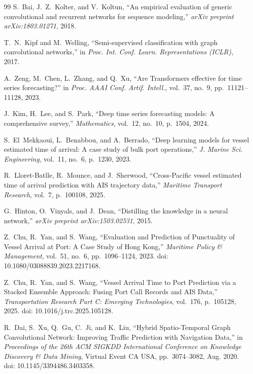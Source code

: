 \documentclass[sigconf,anonymous]{acmart}%
\begin{document}
\begin{thebibliography}{99}
S.~Bai, J.~Z.~Kolter, and V.~Koltun, ``An empirical evaluation of generic convolutional and recurrent networks for sequence modeling,'' \textit{arXiv preprint arXiv:1803.01271}, 2018.

T.~N.~Kipf and M.~Welling, ``Semi-supervised classification with graph convolutional networks,'' in \textit{Proc. Int. Conf. Learn. Representations (ICLR)}, 2017.

A.~Zeng, M.~Chen, L.~Zhang, and Q.~Xu, ``Are Transformers effective for time series forecasting?'' in \textit{Proc. AAAI Conf. Artif. Intell.}, vol.~37, no.~9, pp.~11121--11128, 2023.

J.~Kim, H.~Lee, and S.~Park, ``Deep time series forecasting models: A comprehensive survey,'' \textit{Mathematics}, vol.~12, no.~10, p.~1504, 2024.

S.~El~Mekkaoui, L.~Benabbou, and A.~Berrado, ``Deep learning models for vessel estimated time of arrival: A case study of bulk port operations,'' \textit{J. Marine Sci. Engineering}, vol.~11, no.~6, p.~1230, 2023.

R.~Lloret-Batlle, R.~Mounce, and J.~Sherwood, ``Cross-Pacific vessel estimated time of arrival prediction with AIS trajectory data,'' \textit{Maritime Transport Research}, vol.~7, p.~100108, 2025.

G.~Hinton, O.~Vinyals, and J.~Dean, ``Distilling the knowledge in a neural network,'' \textit{arXiv preprint arXiv:1503.02531}, 2015.

Z.~Chu, R.~Yan, and S.~Wang, ``Evaluation and Prediction of Punctuality of Vessel Arrival at Port: A Case Study of Hong Kong,'' \textit{Maritime Policy \& Management}, vol.~51, no.~6, pp.~1096--1124, 2023. doi: 10.1080/03088839.2023.2217168.

Z.~Chu, R.~Yan, and S.~Wang, ``Vessel Arrival Time to Port Prediction via a Stacked Ensemble Approach: Fusing Port Call Records and AIS Data,'' \textit{Transportation Research Part C: Emerging Technologies}, vol.~176, p.~105128, 2025. doi: 10.1016/j.trc.2025.105128.

R.~Dai, S.~Xu, Q.~Gu, C.~Ji, and K.~Liu, ``Hybrid Spatio-Temporal Graph Convolutional Network: Improving Traffic Prediction with Navigation Data,'' in \textit{Proceedings of the 26th ACM SIGKDD International Conference on Knowledge Discovery \& Data Mining}, Virtual Event CA USA, pp.~3074--3082, Aug. 2020. doi: 10.1145/3394486.3403358.


\end{thebibliography}
\end{document}
